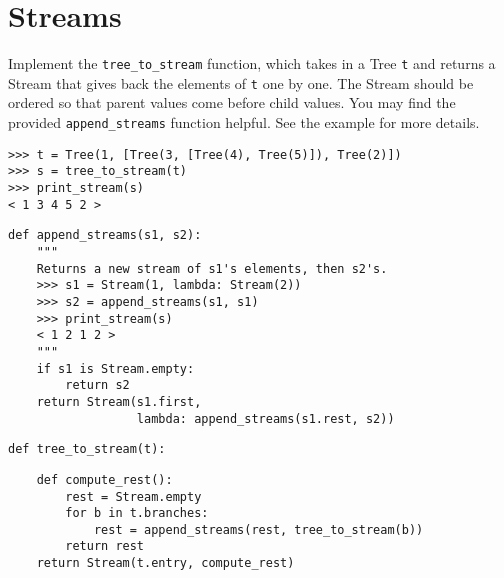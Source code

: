 \section{Streams}
\begin{questions}
\question
Implement the \texttt{tree\_to\_stream} function, which takes in a Tree \texttt{t} and returns a Stream that gives back the elements of \texttt{t} one by one. The Stream should be ordered so that parent values come before child values. You may find the provided \texttt{append\_streams} function helpful. See the example for more details.

\begin{lstlisting}
>>> t = Tree(1, [Tree(3, [Tree(4), Tree(5)]), Tree(2)])
>>> s = tree_to_stream(t)
>>> print_stream(s)
< 1 3 4 5 2 >
\end{lstlisting}

\begin{lstlisting}
def append_streams(s1, s2):
    """
    Returns a new stream of s1's elements, then s2's.
    >>> s1 = Stream(1, lambda: Stream(2))
    >>> s2 = append_streams(s1, s1)
    >>> print_stream(s)
    < 1 2 1 2 >
    """
    if s1 is Stream.empty:
        return s2
    return Stream(s1.first,
                  lambda: append_streams(s1.rest, s2))
\end{lstlisting}

\begin{lstlisting}
def tree_to_stream(t):
\end{lstlisting}
\begin{solution}[1in]
\begin{lstlisting}
    def compute_rest():
        rest = Stream.empty
        for b in t.branches:
            rest = append_streams(rest, tree_to_stream(b))
        return rest
    return Stream(t.entry, compute_rest)
\end{lstlisting}
\end{solution}
\end{questions}

\clearpage

